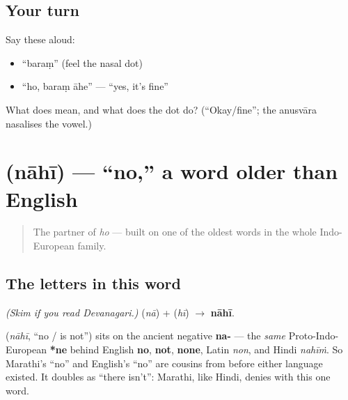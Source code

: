 \subsection*{Your turn}
Say these aloud:

\begin{itemize}
\raggedright
  \item \textquotedblleft{}baraṃ\textquotedblright{} (feel the nasal dot)
  \item \textquotedblleft{}ho, baraṃ āhe\textquotedblright{} — \textquotedblleft{}yes, it's fine\textquotedblright{}
\end{itemize}

\begin{tcolorbox}[breakable,colback=teal!4,colframe=teal!35!black,title={Before you move on}]
What does \textbf{} mean, and what does the dot \textbf{} do? (\textquotedblleft{}Okay/fine\textquotedblright{}; the anusvāra nasalises the vowel.)
\end{tcolorbox}
\section[\texorpdfstring{\mr{नाही} (nahi)}{नाही (nahi)}]{ (nāhī) — \textquotedblleft{}no,\textquotedblright{} a word older than English}

\label{lesson:MR-C01-nahi}



\begin{quote}
The partner of \emph{ho} — built on one of the oldest words in the whole Indo-European family.
\end{quote}

\subsection*{The letters in this word}
\emph{(Skim if you read Devanagari.)} \textbf{} (\emph{nā}) + \textbf{} (\emph{hī}) $\to$ \textbf{nāhī}.

\begin{cousinweb}
\textbf{} (\emph{nāhī}, \textquotedblleft{}no / is not\textquotedblright{}) sits on the ancient negative \textbf{na-} — the \emph{same} Proto-Indo-European \textbf{*ne} behind English \textbf{no}, \textbf{not}, \textbf{none}, Latin \emph{non}, and Hindi \emph{nahīṁ}. So Marathi's \textquotedblleft{}no\textquotedblright{} and English's \textquotedblleft{}no\textquotedblright{} are cousins from before either language existed. It doubles as \textquotedblleft{}there isn't\textquotedblright{}: Marathi, like Hindi, denies with this one word.
\end{cousinweb}

